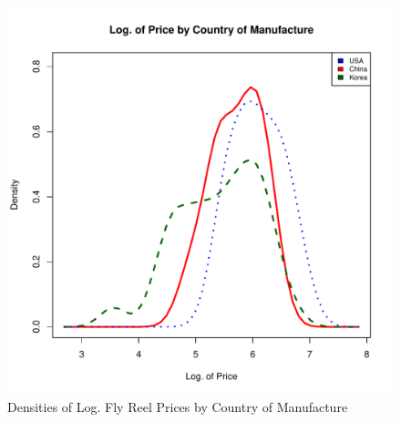 \documentclass[11pt]{book}
\begin{document}
\begin{figure}[h!]
  \centering
  \includegraphics[scale = 0.5, keepaspectratio=true]{../Figures/dens_by_country}
  \caption{Densities of Log. Fly Reel Prices by Country of Manufacture} \label{fig:dens_by_country}
\end{figure}




\end{document}
